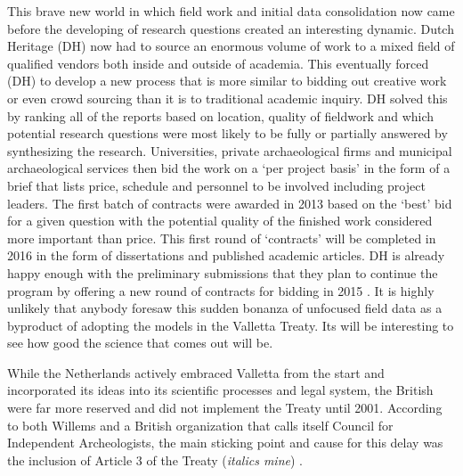 \documentclass[english]{ijsra}
\begin{document}
This brave new world in which field work and initial data consolidation now came before the developing of research questions created an interesting dynamic. Dutch Heritage (DH) now had to source an enormous volume of work to a mixed field of qualified vendors both inside and outside of academia. This eventually forced (DH) to develop a new process that is more similar to bidding out creative work or even crowd sourcing than it is to traditional academic inquiry. DH solved this by ranking all of the reports based on location, quality of fieldwork and which potential research questions were most likely to be fully or partially answered by synthesizing the research. Universities, private archaeological firms and municipal archaeological services then bid the work on a ‘per project basis’ in the form of a brief that lists price, schedule and personnel to be involved including project leaders. 
The first batch of contracts were awarded in 2013 based on the ‘best’ bid for a given question with the potential quality of the finished work considered more important than price. This first round of ‘contracts’ will be completed in 2016 in the form of dissertations and published academic articles. DH is already happy enough with the preliminary submissions that they plan to continue the program by offering a new round of contracts for bidding in 2015 \parencite{Groenewoudt_2014}. 
It is highly unlikely that anybody foresaw this sudden bonanza of unfocused field data as a byproduct of adopting the models in the Valletta Treaty. Its will be interesting to see how good the science that comes out will be. 


While the Netherlands actively embraced Valletta from the start and incorporated its ideas into its scientific processes and legal system, the British were far more reserved and did not implement the Treaty until 2001. According to both Willems and a British organization that calls itself Council for Independent Archeologists, the main sticking point and cause for this delay was the inclusion of Article 3 of the Treaty (\textit{italics mine}) \parencites[62]{Willems_2007}{CIA_2001}. 
\end{document}
